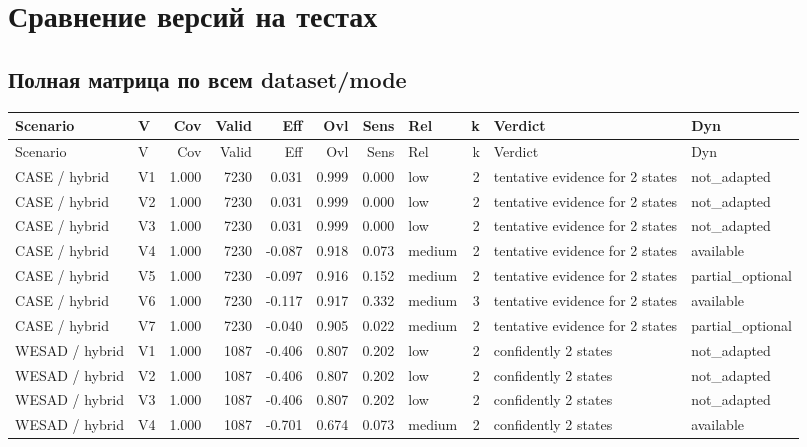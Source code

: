 \documentclass[11pt,a4paper]{article}
\begin{document}
\section{Сравнение версий на тестах}
\subsection*{Полная матрица по всем dataset/mode}
\begin{landscape}
\scriptsize
\begin{longtable}{p{2.8cm}p{0.8cm}rrrrrp{1.2cm}rp{4.4cm}p{1.6cm}}
\toprule
Scenario & V & Cov & Valid & Eff & Ovl & Sens & Rel & k & Verdict & Dyn \\
\midrule
\endfirsthead
\toprule
Scenario & V & Cov & Valid & Eff & Ovl & Sens & Rel & k & Verdict & Dyn \\
\midrule
\endhead
CASE / hybrid & V1 & 1.000 & 7230 & 0.031 & 0.999 & 0.000 & low & 2 & tentative evidence for 2 states & not\_adapted \\
CASE / hybrid & V2 & 1.000 & 7230 & 0.031 & 0.999 & 0.000 & low & 2 & tentative evidence for 2 states & not\_adapted \\
CASE / hybrid & V3 & 1.000 & 7230 & 0.031 & 0.999 & 0.000 & low & 2 & tentative evidence for 2 states & not\_adapted \\
CASE / hybrid & V4 & 1.000 & 7230 & -0.087 & 0.918 & 0.073 & medium & 2 & tentative evidence for 2 states & available \\
CASE / hybrid & V5 & 1.000 & 7230 & -0.097 & 0.916 & 0.152 & medium & 2 & tentative evidence for 2 states & partial\_optional \\
CASE / hybrid & V6 & 1.000 & 7230 & -0.117 & 0.917 & 0.332 & medium & 3 & tentative evidence for 2 states & available \\
CASE / hybrid & V7 & 1.000 & 7230 & -0.040 & 0.905 & 0.022 & medium & 2 & tentative evidence for 2 states & partial\_optional \\
WESAD / hybrid & V1 & 1.000 & 1087 & -0.406 & 0.807 & 0.202 & low & 2 & confidently 2 states & not\_adapted \\
WESAD / hybrid & V2 & 1.000 & 1087 & -0.406 & 0.807 & 0.202 & low & 2 & confidently 2 states & not\_adapted \\
WESAD / hybrid & V3 & 1.000 & 1087 & -0.406 & 0.807 & 0.202 & low & 2 & confidently 2 states & not\_adapted \\
WESAD / hybrid & V4 & 1.000 & 1087 & -0.701 & 0.674 & 0.073 & medium & 2 & confidently 2 states & available \\

\end{longtable}
\end{landscape}
\end{document}
